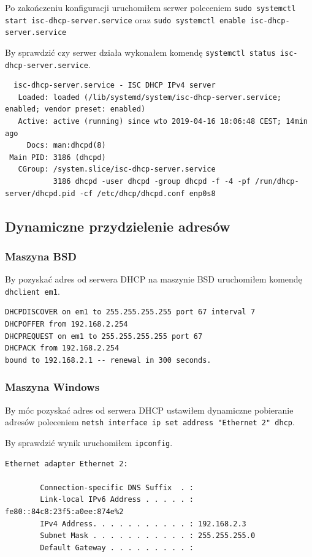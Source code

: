\documentclass{mwart} %
\begin{document}
Po zakończeniu konfiguracji uruchomiłem serwer poleceniem \texttt{sudo systemctl start isc-dhcp-server.service} oraz \texttt{sudo systemctl enable isc-dhcp-server.service}

\vspace{3mm}
By sprawdzić czy serwer działa wykonałem komendę \texttt{systemctl status isc-dhcp-server.service}.
\begin{verbatim}
  isc-dhcp-server.service - ISC DHCP IPv4 server
   Loaded: loaded (/lib/systemd/system/isc-dhcp-server.service; enabled; vendor preset: enabled)
   Active: active (running) since wto 2019-04-16 18:06:48 CEST; 14min ago
     Docs: man:dhcpd(8)
 Main PID: 3186 (dhcpd)
   CGroup: /system.slice/isc-dhcp-server.service
           3186 dhcpd -user dhcpd -group dhcpd -f -4 -pf /run/dhcp-server/dhcpd.pid -cf /etc/dhcp/dhcpd.conf enp0s8
\end{verbatim}

\subsection{Dynamiczne przydzielenie adresów}

\subsubsection{Maszyna BSD}
By pozyskać adres od serwera DHCP na maszynie BSD uruchomiłem komendę \texttt{dhclient em1}.

\vspace{2mm}
\begin{verbatim}
DHCPDISCOVER on em1 to 255.255.255.255 port 67 interval 7 
DHCPOFFER from 192.168.2.254 
DHCPREQUEST on em1 to 255.255.255.255 port 67 
DHCPACK from 192.168.2.254 
bound to 192.168.2.1 -- renewal in 300 seconds.
\end{verbatim}

\subsubsection{Maszyna Windows}
By móc pozyskać adres od serwera DHCP ustawiłem dynamiczne pobieranie adresów poleceniem \texttt{netsh interface ip set address "Ethernet 2" dhcp}.

By sprawdzić wynik uruchomiłem \texttt{ipconfig}.
\begin{verbatim}
Ethernet adapter Ethernet 2:

        Connection-specific DNS Suffix  . :
        Link-local IPv6 Address . . . . . : fe80::84c8:23f5:a0ee:874e%2
        IPv4 Address. . . . . . . . . . . : 192.168.2.3
        Subnet Mask . . . . . . . . . . . : 255.255.255.0
        Default Gateway . . . . . . . . . : 
\end{verbatim}
\end{document}
